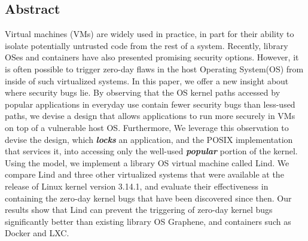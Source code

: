 \subsection*{Abstract}

Virtual machines (VMs) are widely used in practice, in part for their ability to
isolate potentially untrusted code from the rest of a system.
Recently, library OSes and containers have also presented promising security options.
%
However, it is often possible to trigger zero-day flaws
in the host Operating System(OS) from inside of such virtualized systems.
%
In this paper, we offer a new insight about where security bugs lie. By observing that the OS kernel paths accessed
by popular applications in everyday use contain fewer security bugs than less-used paths, we devise a design that allows applications to run more securely in VMs on top of a vulnerable host OS.
Furthermore, We
leverage this observation to devise the \lip design, which
\textbf{\textit{locks}} an application, and the POSIX implementation that services it, into
accessing only the well-used \textbf{\textit{popular}} portion of the kernel.  Using the \lip model, we
implement a library OS virtual machine called Lind.
%
We compare Lind and three other virtualized systems that were
available at the release of Linux kernel version 3.14.1, and evaluate
their effectiveness in containing the zero-day kernel bugs that have been discovered
since then.
%
Our results show that Lind can prevent the triggering of zero-day kernel bugs significantly better
than existing library OS Graphene, and containers such as Docker and LXC.
